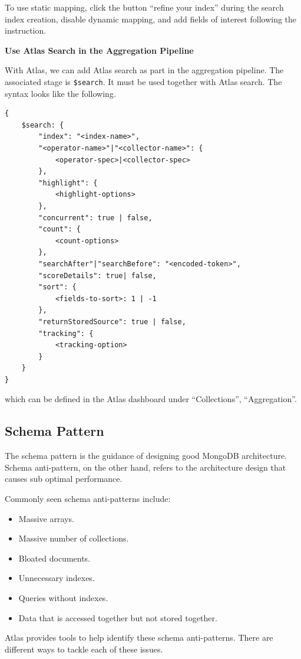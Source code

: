 To use static mapping, click the button ``refine your index'' during the search index creation, disable dynamic mapping, and add fields of interest following the instruction.

\vspace{0.1in}
\noindent \textbf{Use Atlas Search in the Aggregation Pipeline}
\vspace{0.1in}

With Atlas, we can add Atlas search as part in the aggregation pipeline. The associated stage is \verb|$search|. It must be used together with Atlas search. The syntax looks like the following.

\begin{lstlisting}
{
	$search: {
		"index": "<index-name>",
		"<operator-name>"|"<collector-name>": {
			<operator-spec>|<collector-spec>
		},
		"highlight": {
			<highlight-options>
		},
		"concurrent": true | false,
		"count": {
			<count-options>
		},
		"searchAfter"|"searchBefore": "<encoded-token>",
		"scoreDetails": true| false,
		"sort": {
			<fields-to-sort>: 1 | -1
		},
		"returnStoredSource": true | false,
		"tracking": {
			<tracking-option>
		}
	}
}
\end{lstlisting}
which can be defined in the Atlas dashboard under ``Collections'', ``Aggregation''.

\subsection{Schema Pattern}

The schema pattern is the guidance of designing good MongoDB architecture. Schema anti-pattern, on the other hand, refers to the architecture design that causes sub optimal performance.

Commonly seen schema anti-patterns include:
\begin{itemize}
	\item Massive arrays.
	\item Massive number of collections.
	\item Bloated documents.
	\item Unnecessary indexes.
	\item Queries without indexes.
	\item Data that is accessed together but not stored together.
\end{itemize}

Atlas provides tools to help identify these schema anti-patterns. There are different ways to tackle each of these issues.

